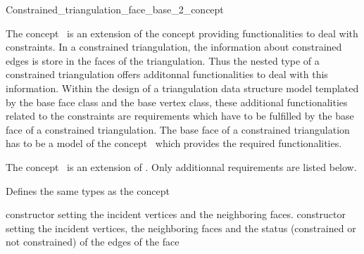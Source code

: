 

\begin{ccRefConcept}{Constrained_triangulation_face_base_2_concept}


\ccDefinition
The concept \ccRefName\ is  an extension of the concept
providing functionalities to deal with
constraints.  
In a constrained triangulation,
the information about constrained edges is store in the 
faces of the triangulation.
Thus the nested 
type of a constrained triangulation offers
additonnal functionalities to deal with this information.
Within the design of a triangulation data structure
model templated by the base face class and the base vertex class,
these additional functionalities related to the constraints
are requirements which have to be fulfilled
by the base face of  a constrained triangulation.
The base face of a constrained triangulation
has to be a model of the concept
\ccRefName\ which provides the
required functionalities.

The concept \ccRefName\ is  an extension of 
. Only additionnal
requirements are listed below.

\ccTypes
Defines the same types as the  concept


\ccCreation
{}  %

\ccGlue
{}
\ccGlue
{} 
{constructor setting the incident vertices and the neighboring faces.}
\ccGlue
{}
 {constructor setting the incident vertices, the neighboring faces and 
the status (constrained or not constrained) of the edges of the face}
                   


\end{ccRefConcept}
